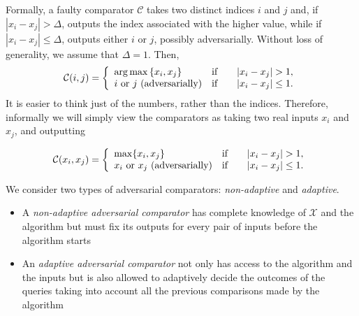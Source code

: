 \documentclass[twoside,11pt]{article}
\def \sets#1{{\{#1\}}}
\newcommand{\cC}{\mathcal{C}}
\newcommand{\cX}{\mathcal{X}}
\newcommand{\thrr}{\Delta}
\begin{document}
Formally, a faulty comparator $\cC$ takes two distinct indices $i$ and $j$ and,
if $|x_i-x_j|>\thrr$, outputs the index associated with the higher value,
while if $|x_i-x_j|\le\thrr$, outputs either $i$ or $j$, possibly
adversarially. 
Without loss of generality, we assume that $\thrr=1$. Then, 
\[
\cC(i,j)= \left\{
\begin{array}{ll}
\arg\max\sets{x_i,x_j} & \text{if\qquad} |x_i-x_j|>1,\\
i \text{ or } j \text{ (adversarially)} & \text{if\qquad} |x_i-x_j|\le1.
\end{array} \right.
\]
It is easier to think just of the numbers, rather than the indices.
Therefore, informally we will simply view 
the comparators as taking two real inputs $x_i$ and $x_j$, and outputting

\begin{equation}
\label{eq:comp}
\cC(x_i,x_j)= \left\{
\begin{array}{ll}
\max \{x_i,x_j\} & \text{if\qquad} |x_i-x_j|>1,\\
x_i \text{ or } x_j \text{ (adversarially)} & \text{if\qquad} |x_i-x_j| \le 1.
\end{array} \right.
\end{equation}

We consider two types of adversarial comparators: \emph{non-adaptive}
and \emph{adaptive}.
\begin{itemize}
\item 
A \emph{non-adaptive adversarial comparator} has complete knowledge of $\cX$ and the algorithm but must fix its outputs for every pair of inputs before the algorithm starts
\item 
An \emph{adaptive adversarial comparator} not only has access to the algorithm and the inputs but is also allowed to adaptively decide the outcomes of the queries taking into account all the previous comparisons made by the algorithm
\end{itemize}
\end{document}
